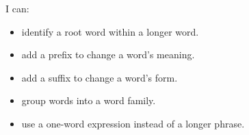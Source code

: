 \begin{selfcheck}
I can:
\begin{itemize}
    \item identify a root word within a longer word.
    \item add a prefix to change a word's meaning.
    \item add a suffix to change a word's form.
    \item group words into a word family.
    \item use a one-word expression instead of a longer phrase.
\end{itemize}
\end{selfcheck}